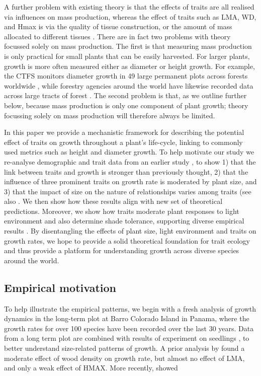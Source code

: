 \documentclass[12pt, a4paper]{article}
\begin{document}
A further problem with existing theory is that the effects of traits are all
realised via influences on mass production\citep{enquist_general_2007},
whereas the effect of traits such as LMA, WD, and Hmax is via the quality of
tissue construction, or the amount of mass allocated to different tissues
\citep{falster_influence_2011}. There are in fact two problems with theory
focussed solely on mass production. The first is that measuring mass
production is only practical for small plants that can be easily harvested.
For larger plants, growth is more often measured either as diameter or height
growth. For example, the CTFS monitors diameter growth in 49 large permanent
plots across forests worldwide \citep{anderson_teixeira_ctfs_forestgeo_2014},
while forestry agencies around the world have likewise recorded data across
large tracts of forest \citep{purves_predictive_2008}. The second problem is
that, as we outline further below, because mass production is only one
component of plant growth; theory focussing solely on mass production will
therefore always be limited.

In this paper we provide a mechanistic framework for describing the potential
effect of traits on growth throughout a plant's life-cycle, linking to
commonly used metrics such as height and diameter growth. To help motivate our
study we re-analyse demographic and trait data from an earlier study
\citep{wright_functional_2010}, to show 1) that the link between traits and
growth is stronger than previously thought, 2) that the influence of three
prominent traits on growth rate is moderated by plant size, and 3) that the
impact of size on the nature of relationships varies among traits (see also
\citet{ruger_functional_2012}. We then show how these results align with new
set of theoretical predictions. Moreover, we show how traits moderate plant
responses to light environment and also determine shade tolerance, supporting
diverse empirical results \citep{ruger_functional_2012, poorter_leaf_2006}. By
disentangling the effects of plant size, light environment and traits on
growth rates, we hope to provide a solid theoretical foundation for trait
ecology and thus provide a platform for understanding growth across diverse
species around the world.

\subsection*{Empirical motivation}\label{fresh-empirical-motivation}

To help illustrate the empirical patterns, we begin with a fresh analysis of
growth dynamics in the long-term plot at Barro Colorado Island in Panama,
where the growth rates for over 100 species have been recorded over the last
30 years. Data from a long term plot \citep{condit_barro_2012} are combined
with results of experiment on seedlings \citep{kitajima_leaf_2013}, to better understand
size-related patterns of growth. A prior analysis by
\citet{wright_functional_2010} found a moderate effect of wood density on
growth rate, but almost no effect of LMA, and only a weak effect of HMAX. More recently,
\citet{ruger_functional_2012} showed
\end{document}
